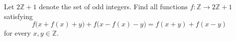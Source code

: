 Let $2\mathbb{Z} + 1$ denote the set of odd integers. Find all functions $f \colon \mathbb{Z} \to 2\mathbb{Z} + 1$ satisfying
\[
f\bigl(x + f(x) + y\bigr) + f\bigl(x - f(x) - y\bigr) = f(x + y) + f(x - y)
\]
for every $x, y \in \mathbb{Z}$.
